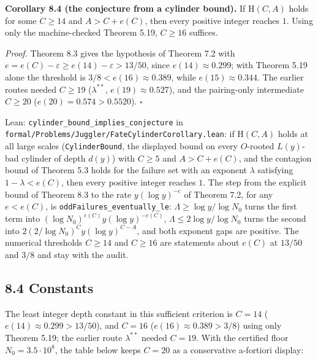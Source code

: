 \documentclass[11pt,a4paper]{article}
\begin{document}
\textbf{Corollary 8.4 (the conjecture from a cylinder bound).} If
\(\mathrm H(C,A)\) holds for some \(C\ge 14\) and \(A>C+e(C)\), then
every positive integer reaches \(1\). Using only the machine-checked
Theorem 5.19, \(C\ge 16\) suffices.

\emph{Proof.} Theorem 8.3 gives the hypothesis of Theorem 7.2 with
\(e=e(C)-\varepsilon\ge e(14)-\varepsilon>13/50\), since
\(e(14)\approx0.299\); with Theorem 5.19 alone the threshold is
\(3/8<e(16)\approx0.389\), while \(e(15)\approx0.344\). The earlier
routes needed \(C\ge19\) (\(\lambda^{**}\), \(e(19)\approx0.527\)), and
the pairing-only intermediate \(C\ge 20\) (\(e(20)=0.574>0.5520\)).
\(\square\)

Lean: \texttt{\nolinkurl{cylinder_bound_implies_conjecture}} in
\texttt{\nolinkurl{formal/Problems/Juggler/FateCylinderCorollary.lean}}:
if \(\mathrm H(C,A)\) holds at all large scales
(\texttt{\nolinkurl{CylinderBound}}, the displayed bound on every
\(O\)-rooted \(L(y)\)-bad cylinder of depth \(d(y)\)) with \(C\ge 5\)
and \(A>C+e(C)\), and the contagion bound of Theorem 5.3 holds for the
failure set with an exponent \(\lambda\) satisfying \(1-\lambda<e(C)\),
then every positive integer reaches \(1\). The step from the explicit
bound of Theorem 8.3 to the rate \(y(\log y)^{-e}\) of Theorem 7.2, for
any \(e<e(C)\), is \texttt{\nolinkurl{oddFailures_eventually_le}}:
\(\Lambda\ge\log y/\log N_0\) turns the first term into
\((\log N_0)^{e(C)}y(\log y)^{-e(C)}\), \(\Lambda\le 2\log y/\log N_0\)
turns the second into \(2(2/\log N_0)^Cy(\log y)^{C-A}\), and both
exponent gaps are positive. The numerical thresholds \(C\ge14\) and
\(C\ge16\) are statements about \(e(C)\) at \(13/50\) and \(3/8\) and
stay with the audit.

\subsection{8.4 Constants}\label{constants}

The least integer depth constant in this sufficient criterion is
\(C=14\) (\(e(14)\approx0.299>13/50\)), and \(C=16\)
(\(e(16)\approx0.389>3/8\)) using only Theorem 5.19; the earlier route
\(\lambda^{**}\) needed \(C=19\). With the certified floor
\(N_0=3.5\cdot 10^8\), the table below keeps \(C=20\) as a conservative
a-fortiori display:

\begingroup\small
\end{document}
